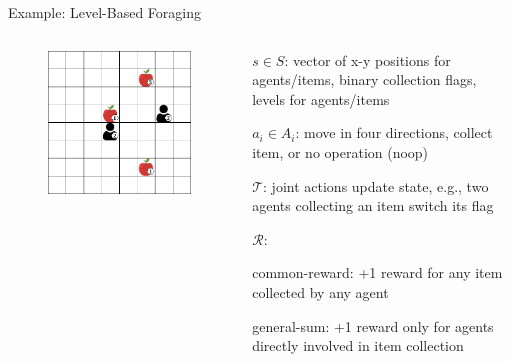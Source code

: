 \begin{frame}{Example: Level-Based Foraging}

\begin{columns}
    \begin{column}{0.45\textwidth}
    \begin{figure}
        \centering
        \includegraphics[width = 0.8\linewidth, keepaspectratio]{images/environments/lbf/lbf-8x8-2p-3f.png}
        \label{fig:enter-label}
    \end{figure}
    \end{column}

    \begin{column}{0.55\textwidth}
    \vspace{5pt}
    \blist
        \item \(s \in S\): vector of x-y positions for agents/items, binary collection flags, levels for agents/items
        \item \(a_i \in A_i\): move in four directions, collect item, or no operation (noop)
        \item \(\mathcal{T}\): joint actions update state, e.g., two agents collecting an item switch its flag
        \item \(\mathcal{R}\):
            \blist
                \item common-reward: +1 reward for any item collected by any agent
                \item general-sum: +1 reward only for agents directly involved in item collection
            \elist
    \elist
    \end{column}

\end{columns}
\end{frame}

